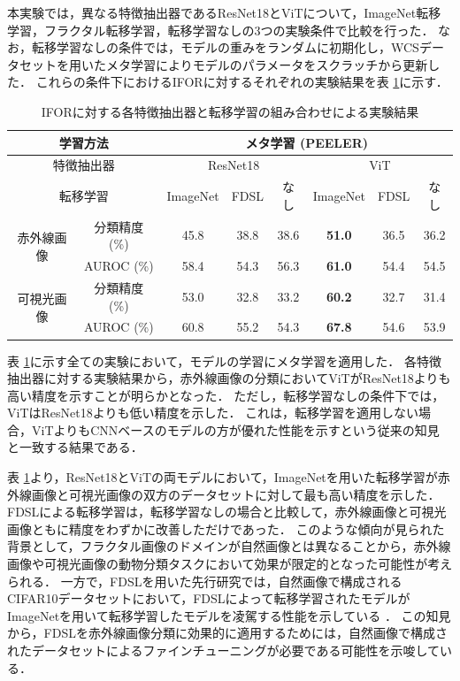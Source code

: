 本実験では，異なる特徴抽出器であるResNet18とViTについて，ImageNet転移学習，フラクタル転移学習，転移学習なしの3つの実験条件で比較を行った．
なお，転移学習なしの条件では，モデルの重みをランダムに初期化し，WCSデータセットを用いたメタ学習によりモデルのパラメータをスクラッチから更新した．
これらの条件下におけるIFORに対するそれぞれの実験結果を表 \ref{tbl:exp1}に示す．
% 
\begin{table}[tbp]
  \centering
  \caption{IFORに対する各特徴抽出器と転移学習の組み合わせによる実験結果}
  \label{tbl:exp1}

  \begin{tabular}{cc||c|c|c|c|c|c}
      \hline
      \multicolumn{2}{c||}{学習方法}            & \multicolumn{6}{c}{メタ学習 (PEELER)}                        \\ \hline
      \multicolumn{2}{c||}{特徴抽出器}           & \multicolumn{3}{c|}{ResNet18} & \multicolumn{3}{c}{ViT}     \\ \hline
      \multicolumn{2}{c||}{転移学習}            &  ImageNet  &  FDSL  &  なし   &   ImageNet    & FDSL & なし  \\ \hline\hline
      \multirow{2}{*}{赤外線画像} & 分類精度 (\%) &    45.8    &  38.8  &  38.6  & \textbf{51.0} & 36.5 & 36.2 \\
                                & AUROC (\%)   &    58.4    &  54.3  &  56.3  & \textbf{61.0} & 54.4 & 54.5 \\ \hline
      \multirow{2}{*}{可視光画像} & 分類精度 (\%) &    53.0    &  32.8  &  33.2  & \textbf{60.2} & 32.7 & 31.4 \\
                                & AUROC (\%)   &    60.8    &  55.2  &  54.3  & \textbf{67.8} & 54.6 & 53.9 \\ \hline
  \end{tabular}
\end{table}
% 
表 \ref{tbl:exp1}に示す全ての実験において，モデルの学習にメタ学習を適用した．
各特徴抽出器に対する実験結果から，赤外線画像の分類においてViTがResNet18よりも高い精度を示すことが明らかとなった．
ただし，転移学習なしの条件下では，ViTはResNet18よりも低い精度を示した．
これは，転移学習を適用しない場合，ViTよりもCNNベースのモデルの方が優れた性能を示すという従来の知見 \cite{vit}と一致する結果である．

表 \ref{tbl:exp1}より，ResNet18とViTの両モデルにおいて，ImageNetを用いた転移学習が赤外線画像と可視光画像の双方のデータセットに対して最も高い精度を示した．
FDSLによる転移学習は，転移学習なしの場合と比較して，赤外線画像と可視光画像ともに精度をわずかに改善しただけであった．
このような傾向が見られた背景として，フラクタル画像のドメインが自然画像とは異なることから，赤外線画像や可視光画像の動物分類タスクにおいて効果が限定的となった可能性が考えられる．
一方で，FDSLを用いた先行研究では，自然画像で構成されるCIFAR10データセットにおいて，FDSLによって転移学習されたモデルがImageNetを用いて転移学習したモデルを凌駕する性能を示している \cite{fdsl}．
この知見から，FDSLを赤外線画像分類に効果的に適用するためには，自然画像で構成されたデータセットによるファインチューニングが必要である可能性を示唆している．

